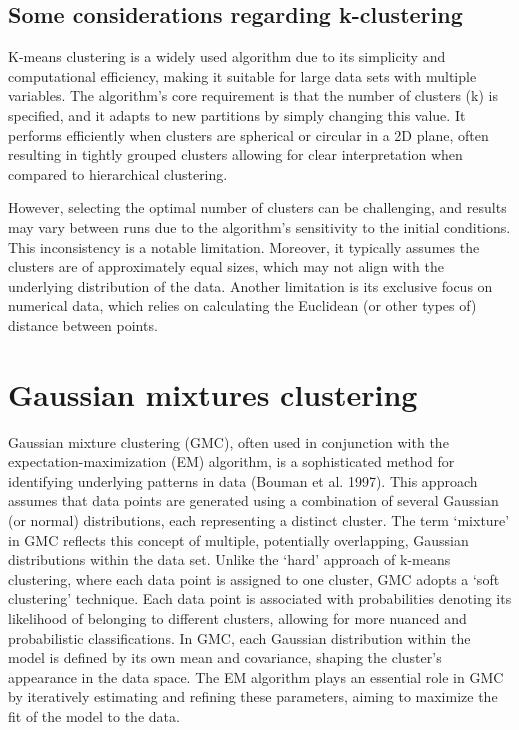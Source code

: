 \subsection{Some considerations regarding
k-clustering}\label{considerations-on-k-clustering}

K-means clustering is a widely used algorithm due to its simplicity and
computational efficiency, making it suitable for large data sets with
multiple variables. The algorithm's core requirement is that the
number of clusters (k) is specified, and it adapts to new partitions by
simply changing this value. It performs efficiently when clusters are
spherical or circular in a 2D plane, often resulting in tightly grouped
clusters allowing for clear interpretation when compared to hierarchical clustering.

However, selecting the optimal number of clusters can be challenging,
and results may vary between runs due to the algorithm's sensitivity to the
initial conditions. This inconsistency is a notable limitation.
Moreover, it typically assumes the clusters are of approximately equal
sizes, which may not align with the underlying distribution of the data.
Another limitation is its exclusive focus on numerical data, which
relies on calculating the Euclidean (or other types of) distance between
points.

\section{Gaussian mixtures clustering}\label{gaussian-mixtures-clusterig}

Gaussian mixture clustering (GMC), often used in conjunction with
the expectation-maximization (EM) algorithm, is a sophisticated method
for identifying underlying patterns in data (Bouman et al. 1997). This
approach assumes that data points are generated using a combination of
several Gaussian (or normal) distributions, each representing a distinct
cluster. The term `mixture' in GMC reflects this concept of multiple,
potentially overlapping, Gaussian distributions within the data set.
Unlike the `hard' approach of k-means clustering, where each data point
is assigned to one cluster, GMC adopts a `soft clustering'
technique. Each data point is associated with probabilities denoting its
likelihood of belonging to different clusters, allowing for more nuanced
and probabilistic classifications. In GMC, each Gaussian distribution
within the model is defined by its own mean and covariance, shaping the
cluster's appearance in the data space. The EM algorithm plays an
essential role in GMC by iteratively estimating and refining these
parameters, aiming to maximize the fit of the model to the
data.

